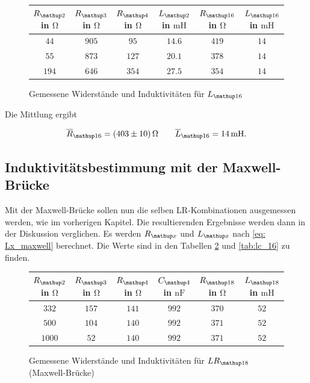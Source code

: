 \begin{figure}
\centering
\caption{Gemessene Widerstände und Induktivitäten für $L\ua{16}$}
  \label{tab:lc_r16}
\begin{tabular}{S S S S S S }
    \toprule
    {$R\ua{2}$  in $\si{\ohm}$} &  {$R\ua{3}$ in $\si{\ohm}$} & {$R\ua{4}$ in $\si{\ohm}$} & {$L\ua{2}$ in $\si{\milli\henry}$}& {$R\ua{16}$ in $\si{\ohm}$} &  {$L\ua{16}$ in $\si{\milli\henry}$} \\
    \midrule
     {$\num{44}$} & {$\num{905}$} &  {$\num{95}$}& {$\num{14,6}$}  &  {$\num{419}$} & {$\num{14}$}\\
     {$\num{55}$} & {$\num{873}$}  & {$\num{127}$} & {$\num{20,1}$} & {$\num{378}$} & {$\num{14}$}\\
     {$\num{194}$} & {$\num{646}$}  & {$\num{354}$} & {$\num{27,5}$} &{$\num{354}$} & {$\num{14}$}  \\
    \bottomrule
  \end{tabular}
 \end{figure}

Die Mittlung ergibt

\begin{equation}
\label{eq:wert_r16_l_16}
\overline{R}_{\map{16}}=\SI{403\pm10}{\ohm} \qquad \overline{L}_{\map{16}}=\SI{14}{\milli\henry}.
\end{equation}

\subsection{Induktivitätsbestimmung mit der Maxwell-Brücke}

Mit der Maxwell-Brücke sollen nun die selben LR-Kombinationen ausgemessen werden, wie %
im vorherigen Kapitel.
Die resultierenden Ergebnisse werden dann in der Diskussion verglichen.
Es werden $R\ua{x}$ und $L\ua{x}$ nach \eqref{eq: Lx_maxwell} berechnet.
Die Werte sind in den Tabellen \ref{tab:lc_r18} und \ref{tab:lc_16} zu finden.

\begin{figure}
\centering
\caption{Gemessene Widerstände und Induktivitäten für $LR\ua{18}$ (Maxwell-Brücke)}
  \label{tab:lc_r18}
\begin{tabular}{S S S S S S }
    \toprule
    {$R\ua{2}$  in $\si{\ohm}$} &  {$R\ua{3}$ in $\si{\ohm}$} & {$R\ua{4}$ in $\si{\ohm}$} & {$C\ua{4}$ in $\si{\nano\farad}$}& {$R\ua{18}$ in $\si{\ohm}$} &  {$L\ua{18}$ in $\si{\milli\henry}$} \\
    \midrule
     {$\num{332}$} & {$\num{157}$} &  {$\num{141}$}& {$\num{992}$}  &  {$\num{370}$} & {$\num{52}$}\\
     {$\num{500}$} & {$\num{104}$}  & {$\num{140}$} & {$\num{992}$} & {$\num{371}$} & {$\num{52}$}\\
     {$\num{1000}$} & {$\num{52}$}  & {$\num{140}$} & {$\num{992}$} &{$\num{371}$} & {$\num{52}$}  \\
    \bottomrule
  \end{tabular}
 \end{figure}


